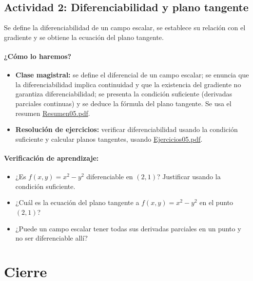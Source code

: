 \documentclass[a4,11pt]{aleph-notas}
\begin{document}
\subsection*{Actividad 2: Diferenciabilidad y plano tangente}
Se define la diferenciabilidad de un campo escalar, se establece su relación con el gradiente y se obtiene la ecuación del plano tangente.

\paragraph{¿Cómo lo haremos?}
\begin{itemize}[leftmargin=*]
    \item \textbf{Clase magistral:} se define el diferencial de un campo escalar; se enuncia que la diferenciabilidad implica continuidad y que la existencia del gradiente no garantiza diferenciabilidad; se presenta la condición suficiente (derivadas parciales continuas) y se deduce la fórmula del plano tangente. Se usa el resumen \href{https://andres-merino.github.io/MatematicaIII-05-N0051/01Resumen/Resumen05.pdf}{Resumen05.pdf}.
    \item \textbf{Resolución de ejercicios:} verificar diferenciabilidad usando la condición suficiente y calcular planos tangentes, usando \href{https://andres-merino.github.io/MatematicaIII-05-N0051/04Ejercicios/Ejercicios05.pdf}{Ejercicios05.pdf}.
\end{itemize}

\paragraph{Verificación de aprendizaje:}
\begin{itemize}[leftmargin=*]
    \item ¿Es $f(x,y)=x^2-y^2$ diferenciable en $(2,1)$? Justificar usando la condición suficiente.
    \item ¿Cuál es la ecuación del plano tangente a $f(x,y)=x^2-y^2$ en el punto $(2,1)$?
    \item ¿Puede un campo escalar tener todas sus derivadas parciales en un punto y no ser diferenciable allí?
\end{itemize}

\section*{Cierre}
\end{document}
